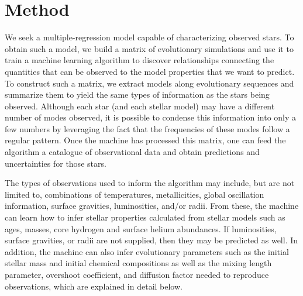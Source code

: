 \documentclass[twocolumn,twocolappendix]{aastex6}
\begin{document}
\section{Method} \label{sec:Method} 
We seek a multiple-regression model capable of characterizing observed stars. To obtain such a model, we build a matrix of evolutionary simulations and use it to train a machine learning algorithm to discover relationships connecting the quantities that can be observed to the model properties that we want to predict. To construct such a matrix, we extract models along evolutionary sequences and summarize them to yield the same types of information as the stars being observed. Although each star (and each stellar model) may have a different number of modes observed, it is possible to condense this information into only a few numbers by leveraging the fact that the frequencies of these modes follow a regular pattern. Once the machine has processed this matrix, one can feed the algorithm a catalogue of observational data and obtain predictions and uncertainties for those stars. 

The types of observations used to inform the algorithm may include, but are not limited to, combinations of temperatures, metallicities, global oscillation information, surface gravities, luminosities, and/or radii. From these, the machine can learn how to infer stellar properties calculated from stellar models such as ages, masses, core hydrogen and surface helium abundances. If luminosities, surface gravities, or radii are not supplied, then they may be predicted as well. In addition, the machine can also infer evolutionary parameters such as the initial stellar mass and initial chemical compositions as well as the mixing length parameter, overshoot coefficient, and diffusion factor needed to reproduce observations, which are explained in detail below. 
\end{document}
